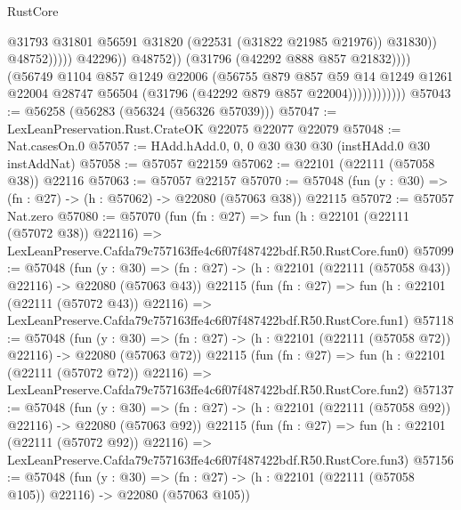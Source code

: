 \begin{lexlean}{RustCore}
\begin{coremodule}
                                              @31793
                                              @31801
                                              @56591
                                              @31820
                                              (@22531 (@31822 @21985 @21976))
                                              @31830))
                                          @48752)))))
                                @42296))
                            @48752))
                        (@31796 (@42292 @888 @857 @21832))))
                    (@56749
                      @1104
                      @857
                      @1249
                      @22006
                      (@56755
                        @879
                        @857
                        @59
                        @14
                        @1249
                        @1261
                        @22004
                        @28747
                        @56504
                        (@31796 (@42292 @879 @857 @22004))))))))))))
@57043 := @56258 (@56283 (@56324 (@56326 @57039)))
@57047 := LexLeanPreservation.Rust.CrateOK @22075 @22077 @22079
@57048 := Nat.casesOn.{0}
@57057 := HAdd.hAdd.{0, 0, 0} @30 @30 @30 (instHAdd.{0} @30 instAddNat)
@57058 := @57057 @22159
@57062 := @22101 (@22111 (@57058 @38)) @22116
@57063 := @57057 @22157
@57070 := @57048 (fun (y : @30) => (fn : @27) -> (h : @57062) -> @22080 (@57063 @38)) @22115
@57072 := @57057 Nat.zero
@57080 := @57070
    (fun (fn : @27) =>
    fun (h : @22101 (@22111 (@57072 @38)) @22116) =>
    LexLeanPreserve.Cafda79c757163ffe4c6f07f487422bdf.R50.RustCore.fun0)
@57099 := @57048
    (fun (y : @30) =>
    (fn : @27) -> (h : @22101 (@22111 (@57058 @43)) @22116) -> @22080 (@57063 @43))
    @22115
    (fun (fn : @27) =>
    fun (h : @22101 (@22111 (@57072 @43)) @22116) =>
    LexLeanPreserve.Cafda79c757163ffe4c6f07f487422bdf.R50.RustCore.fun1)
@57118 := @57048
    (fun (y : @30) =>
    (fn : @27) -> (h : @22101 (@22111 (@57058 @72)) @22116) -> @22080 (@57063 @72))
    @22115
    (fun (fn : @27) =>
    fun (h : @22101 (@22111 (@57072 @72)) @22116) =>
    LexLeanPreserve.Cafda79c757163ffe4c6f07f487422bdf.R50.RustCore.fun2)
@57137 := @57048
    (fun (y : @30) =>
    (fn : @27) -> (h : @22101 (@22111 (@57058 @92)) @22116) -> @22080 (@57063 @92))
    @22115
    (fun (fn : @27) =>
    fun (h : @22101 (@22111 (@57072 @92)) @22116) =>
    LexLeanPreserve.Cafda79c757163ffe4c6f07f487422bdf.R50.RustCore.fun3)
@57156 := @57048
    (fun (y : @30) =>
    (fn : @27) -> (h : @22101 (@22111 (@57058 @105)) @22116) -> @22080 (@57063 @105))

\end{coremodule}
\end{lexlean}
